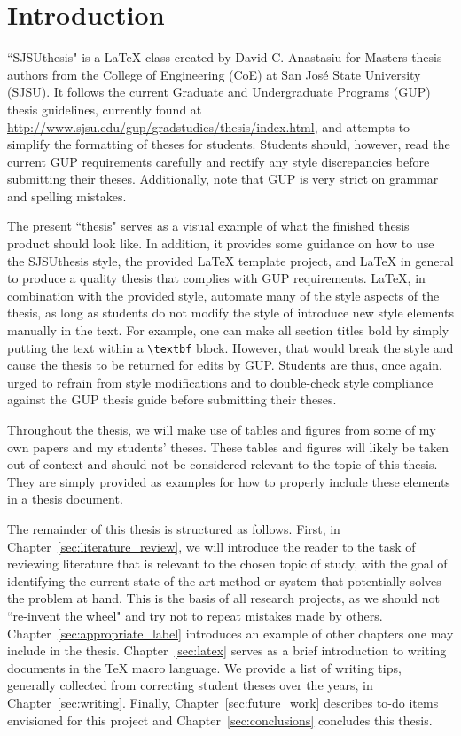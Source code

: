 \section{Introduction}\label{sec:introduction}
``SJSUthesis" is a LaTeX class created by David C. Anastasiu for Masters thesis authors from the College of Engineering (CoE) at San Jos\'{e} State University (SJSU). It follows the current Graduate and Undergraduate Programs (GUP) thesis guidelines, currently found at \url{http://www.sjsu.edu/gup/gradstudies/thesis/index.html}, and attempts to simplify the formatting of theses for students. Students should, however, read the current GUP requirements carefully and rectify any style discrepancies before submitting their theses. Additionally, note that GUP is very strict on grammar and spelling mistakes.

The present ``thesis" serves as a visual example of what the finished thesis product should look like. In addition, it provides some guidance on how to use the SJSUthesis style, the provided LaTeX template project, and LaTeX in general to produce a quality thesis that complies with GUP requirements. LaTeX, in combination with the provided style, automate many of the style aspects of the thesis, as long as students do not modify the style of introduce new style elements manually in the text. For example, one can make all section titles bold by simply putting the text within a \texttt{{\textbackslash}textbf} block. However, that would break the style and cause the thesis to be returned for edits by GUP. Students are thus, once again, urged to refrain from style modifications and to double-check style compliance against the GUP thesis guide before submitting their theses.

Throughout the thesis, we will make use of tables and figures from some of my own papers and my students' theses. These tables and figures will likely be taken out of context and should not be considered relevant to the topic of this thesis. They are simply provided as examples for how to properly include these elements in a thesis document.

The remainder of this thesis is structured as follows. First, in Chapter~\ref{sec:literature_review}, we will introduce the reader to the task of reviewing literature that is relevant to the chosen topic of study, with the goal of identifying the current state-of-the-art method or system that potentially solves the problem at hand. This is the basis of all research projects, as we should not ``re-invent the wheel" and try not to repeat mistakes made by others. Chapter~\ref{sec:appropriate_label} introduces an example of other chapters one may include in the thesis. Chapter~\ref{sec:latex} serves as a brief introduction to writing documents in the TeX macro language. We provide a list of writing tips, generally collected from correcting student theses over the years, in Chapter~\ref{sec:writing}. Finally, Chapter~\ref{sec:future_work} describes to-do items envisioned for this project and Chapter~\ref{sec:conclusions} concludes this thesis.

